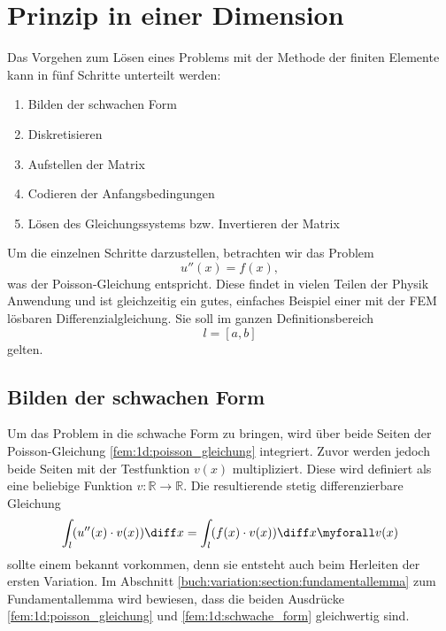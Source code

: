 %
%
%
%
\section{Prinzip in einer Dimension\label{fem:1d}}

Das Vorgehen zum Lösen eines Problems mit der Methode der finiten Elemente kann in fünf Schritte unterteilt werden:
\begin{enumerate}
    \item Bilden der schwachen Form
    \item Diskretisieren
    \item Aufstellen der Matrix
    \item Codieren der Anfangsbedingungen
    \item Lösen des Gleichungssystems bzw. Invertieren der Matrix
\end{enumerate}

Um die einzelnen Schritte darzustellen, betrachten wir das Problem
\begin{equation}
    u''(x) = f(x)
    \label{fem:1d:poisson_gleichung},
\end{equation}
was der Poisson-Gleichung entspricht. 
Diese findet in vielen Teilen der Physik Anwendung und ist gleichzeitig ein gutes, einfaches Beispiel einer mit der FEM lösbaren Differenzialgleichung.
Sie soll im ganzen Definitionsbereich
\begin{equation}
    l = [a,b]
\end{equation}
gelten.


\subsection{Bilden der schwachen Form}
%
Um das Problem in die schwache Form zu bringen, wird über beide Seiten der Poisson-Gleichung \eqref{fem:1d:poisson_gleichung} integriert.
Zuvor werden jedoch beide Seiten mit der Testfunktion $ v(x) $ multipliziert.
%
Diese wird definiert als eine beliebige Funktion $ v \colon \mathbb{R} \rightarrow \mathbb{R} $.
Die resultierende stetig differenzierbare Gleichung
\begin{equation}
    \int_l(u''(x) \cdot v(x)) \diff x = \int_l(f(x) \cdot v(x)) \diff x \myforall v(x)
    \label{fem:1d:schwache_form}
\end{equation}
sollte einem bekannt vorkommen, denn sie entsteht auch beim Herleiten der ersten Variation.
Im Abschnitt \ref{buch:variation:section:fundamentallemma} zum Fundamentallemma wird bewiesen, dass die beiden Ausdrücke \eqref{fem:1d:poisson_gleichung} und \eqref{fem:1d:schwache_form} gleichwertig sind.
%

